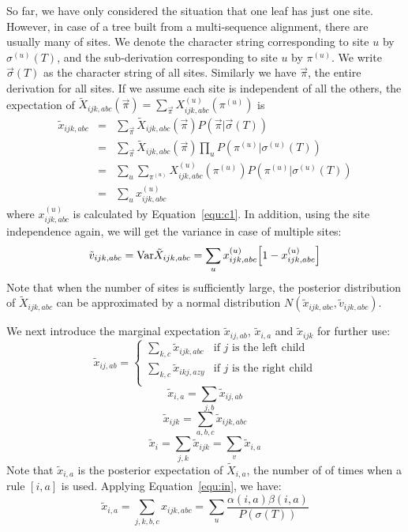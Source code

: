 \documentclass[pdftex,11pt]{article}
\begin{document}
So far, we have only considered the situation that one leaf has just one
site.  However, in case of a tree built from a multi-sequence alignment,
there are usually many of sites. We denote the character string
corresponding to site $u$ by $\sigma^{(u)}(T)$, and the sub-derivation
corresponding to site $u$ by $\pi^{(u)}$. We write $\vec{\sigma}(T)$ as
the character string of all sites. Similarly we have $\vec{\pi}$, the
entire derivation for all sites. If we assume each site is independent
of all the others, the expectation of
$\tilde{X}_{ijk,abc}(\vec{\pi})=\sum_{\vec{\pi}}X^{(u)}_{ijk,abc}(\pi^{(u)})$
is
\begin{eqnarray}\label{equ:cijk-all}
  \tilde{x}_{ijk,abc}&=&\sum_{\vec{\pi}}\tilde{X}_{ijk,abc}(\vec{\pi})P(\vec{\pi}|\vec{\sigma}(T))\nonumber\\
  &=&\sum_{\vec{\pi}}\tilde{X}_{ijk,abc}(\vec{\pi})\prod_u P(\pi^{(u)}|\sigma^{(u)}(T))\nonumber\\
  &=&\sum_u\sum_{\pi^{(u)}}X^{(u)}_{ijk,abc}(\pi^{(u)})P(\pi^{(u)}|\sigma^{(u)}(T))\nonumber\\
  &=&\sum_u x^{(u)}_{ijk,abc}
\end{eqnarray}
where $x^{(u)}_{ijk,abc}$ is calculated by Equation~\ref{equ:c1}. In
addition, using the site independence again, we will get the variance in
case of multiple sites:
\begin{equation}\label{equ:cijk-var-all}
  \tilde{v}_{ijk,abc}={\rm Var}\tilde{X}_{ijk,abc} = \sum_u x^{(u)}_{ijk,abc}\Big[1-x^{(u)}_{ijk,abc}\Big]
\end{equation}
Note that when the number of sites is sufficiently large, the posterior
distribution of $\tilde{X}_{ijk,abc}$ can be approximated by a normal
distribution $N(\tilde{x}_{ijk,abc}, \tilde{v}_{ijk,abc})$.

We next introduce the marginal expectation $\tilde{x}_{ij,ab}$,
$\tilde{x}_{i,a}$ and $\tilde{x}_{ijk}$ for further use:
\begin{equation}
  \tilde{x}_{ij,ab}=\left\{\begin{array}{ll}
      \sum_{k,c}\tilde{x}_{ijk,abc} & \mbox{if $j$ is the left child}\\
      \sum_{k,c}\tilde{x}_{ikj,azy} & \mbox{if $j$ is the right child}\\
\end{array}\right.
\end{equation}
\begin{equation}
  \tilde{x}_{i,a}=\sum_{j,b}\tilde{x}_{ij,ab}
\end{equation}
\begin{equation}
  \tilde{x}_{ijk}=\sum_{a,b,c}\tilde{x}_{ijk,abc}
\end{equation}
\begin{equation}
  \tilde x_{i}=\sum_{j,k}\tilde{x}_{ijk}=\sum_v\tilde{x}_{i,a}
\end{equation}
Note that $\tilde{x}_{i,a}$ is the posterior expectation of
$\tilde{X}_{i,a}$, the number of of times when a rule $[i,a]$ is
used. Applying Equation~\ref{equ:in}, we have:
\begin{equation}
\tilde{x}_{i,a}=\sum_{j,k,b,c}x_{ijk,abc}=\sum_u\frac{\alpha(i,a)\beta(i,a)}{P(\sigma(T))}
\end{equation}
\end{document}
